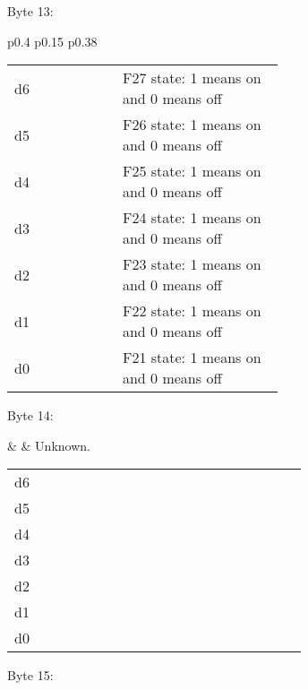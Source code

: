 Byte 13:

\begin{tabular}{p{0.4\linewidth} p{0.15\linewidth} p{0.38\linewidth}} 

\begin{tabular}{|p{0.3cm}|p{0.3cm}|p{0.3cm}|p{0.3cm}|p{0.3cm}|p{0.3cm}|p{0.3cm}|p{0.3cm}|}
\hline
0 & d6 & d5 & d4 & d3 & d2 & d1 & d0\\
\hline
\end{tabular}
&  & Functions.\\
\end{tabular}

\begin{tabular}{p{0.05\linewidth} p{0.6\linewidth}} 
d6 & F27 state: 1 means on and 0 means off\\
d5 & F26 state: 1 means on and 0 means off\\
d4 & F25 state: 1 means on and 0 means off\\
d3 & F24 state: 1 means on and 0 means off\\
d2 & F23 state: 1 means on and 0 means off\\
d1 & F22 state: 1 means on and 0 means off\\
d0 & F21 state: 1 means on and 0 means off\\
\end{tabular}

Byte 14:

&  & Unknown.\\
\end{tabular}

\begin{tabular}{p{0.05\linewidth} p{0.6\linewidth}} 
d6 & \\
d5 & \\
d4 & \\
d3 & \\
d2 & \\
d1 & \\
d0 & \\
\end{tabular}

Byte 15:

